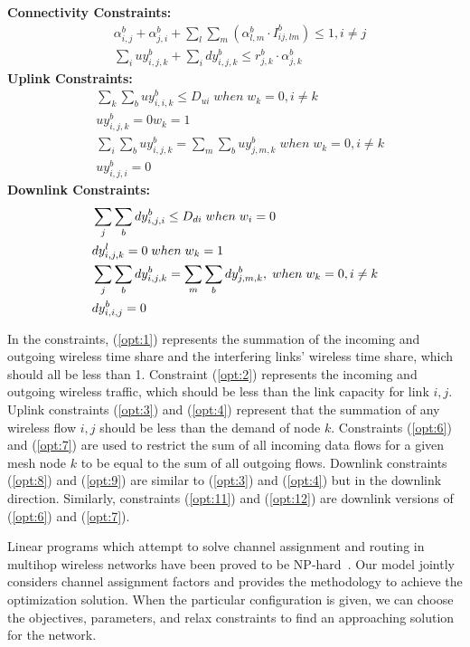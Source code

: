 \noindent
{\bf Connectivity Constraints:}
\begin{align}
\label{opt:1}
& \alpha_{i,j}^b + \alpha_{j,i}^b + \sum_l\sum_m(\alpha_{l,m}^b \cdot I_{ij,lm}^b) \leq 1, i\neq j \\
\label{opt:2}
& \sum_i uy_{i,j,k}^b + \sum_i dy_{i,j,k}^b \leq r_{j,k}^b \cdot \alpha_{j,k}^b 
\end{align}
\noindent
{\bf Uplink Constraints:} 
\begin{align}
\label{opt:3}
& \sum_k \sum_b uy_{i,i,k}^b \leq D_{ui} \; when \; w_k=0, i \neq k \\
\label{opt:4}
& uy_{i,j,k}^b = 0 w_k=1 \\
\label{opt:6}
& \sum_i\sum_b uy_{i,j,k}^b = \sum_m \sum_b uy_{j,m,k}^b \; when \; w_k=0, i \neq k\\
\label{opt:7}
& uy_{i,j,i}^b=0 
\end{align}
\noindent
{\bf Downlink Constraints:} 
\begin{align}
{\bf}
\label{opt:8}
& \sum_j \sum_b dy_{i,j,i}^b \leq D_{di} \; when \; w_i=0 \\
\label{opt:9}
& dy_{i,j,k}^l =0 \; when \; w_k=1 \\
\label{opt:11}
& \sum_j\sum_b dy_{i,j,k}^b = \sum_m \sum_b dy_{j,m,k}^b,\; when \; w_k=0,  i \neq k \\
\label{opt:12}
& dy_{i,i,j}^b=0
\end{align}

In the constraints, (\ref{opt:1}) represents the summation of the incoming and outgoing 
wireless time share and the interfering links' wireless time share, which should all be less than 1.
Constraint (\ref{opt:2}) represents the incoming and outgoing wireless traffic, which 
should be less than the link capacity for link $i,j$. Uplink constraints (\ref{opt:3})
and (\ref{opt:4}) represent that the summation of any wireless flow $i,j$ should be less than
the demand of node $k$.  Constraints (\ref{opt:6}) and (\ref{opt:7}) are used to restrict
the sum of all incoming data flows for a given mesh node $k$ to be equal to the 
sum of all outgoing flows. Downlink constraints (\ref{opt:8}) and (\ref{opt:9}) are
similar to (\ref{opt:3}) and (\ref{opt:4}) but in the downlink direction.  Similarly,
constraints (\ref{opt:11}) and (\ref{opt:12}) are downlink versions of 
(\ref{opt:6}) and (\ref{opt:7}).

Linear programs which attempt to solve channel assignment and routing in multihop
wireless networks have been proved to be NP-hard~\cite{yuan2006cross}. 
Our model jointly considers channel assignment factors and provides the 
methodology to achieve the optimization solution. 
When the particular configuration is given, we can 
choose the objectives, parameters, and relax constraints to 
find an approaching solution for the network.  
 

